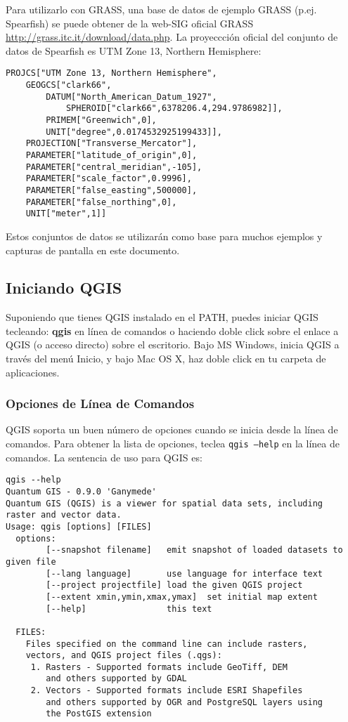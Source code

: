 Para utilizarlo con GRASS, una base de datos de ejemplo GRASS (p.ej. Spearfish) 
se puede obtener de la web-SIG oficial GRASS \url{http://grass.itc.it/download/data.php}. 
La proyeccción oficial del conjunto de datos de Spearfish es UTM Zone 13, Northern Hemisphere: 

\begin{verbatim}
PROJCS["UTM Zone 13, Northern Hemisphere",
    GEOGCS["clark66",
        DATUM["North_American_Datum_1927",
            SPHEROID["clark66",6378206.4,294.9786982]],
        PRIMEM["Greenwich",0],
        UNIT["degree",0.0174532925199433]],
    PROJECTION["Transverse_Mercator"],
    PARAMETER["latitude_of_origin",0],
    PARAMETER["central_meridian",-105],
    PARAMETER["scale_factor",0.9996],
    PARAMETER["false_easting",500000],
    PARAMETER["false_northing",0],
    UNIT["meter",1]]
\end{verbatim}

Estos conjuntos de datos se utilizarán como base para muchos ejemplos y 
capturas de pantalla en este documento.

\subsection{Iniciando QGIS}\label{label_startinqgis}

Suponiendo que tienes QGIS instalado en el PATH, puedes iniciar QGIS tecleando:
\textbf{qgis}  en línea de comandos o haciendo doble click sobre el enlace a QGIS 
(o acceso directo) sobre el escritorio. Bajo MS Windows, inicia QGIS a través 
del menú Inicio, y bajo Mac OS X, haz doble click en tu carpeta de aplicaciones. 

\subsubsection{Opciones de Línea de Comandos}
\label{label_commandline}

QGIS soporta un buen número de opciones cuando se inicia desde la línea de 
comandos. Para obtener la lista de opciones, teclea \texttt{qgis ---help} en la
línea de comandos.
La sentencia de uso para QGIS es:

\small
\begin{verbatim}
qgis --help
Quantum GIS - 0.9.0 'Ganymede'
Quantum GIS (QGIS) is a viewer for spatial data sets, including
raster and vector data.
Usage: qgis [options] [FILES]
  options:
        [--snapshot filename]   emit snapshot of loaded datasets to given file
        [--lang language]       use language for interface text
        [--project projectfile] load the given QGIS project
        [--extent xmin,ymin,xmax,ymax]  set initial map extent
        [--help]                this text

  FILES:
    Files specified on the command line can include rasters,
    vectors, and QGIS project files (.qgs):
     1. Rasters - Supported formats include GeoTiff, DEM
        and others supported by GDAL
     2. Vectors - Supported formats include ESRI Shapefiles
        and others supported by OGR and PostgreSQL layers using
        the PostGIS extension
\end{verbatim}
\normalsize

